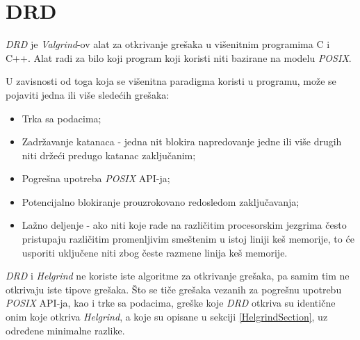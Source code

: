 \documentclass[12pt,oneside]{memoir}
\theoremstyle{plain}
\theoremstyle{definition}
\begin{document}
\section{DRD}
\textit{DRD} je \textit{Valgrind}-ov alat za otkrivanje grešaka u višenitnim programima C i C++. Alat radi za bilo koji program koji koristi niti bazirane na modelu \textit{POSIX}.

U zavisnosti od toga koja se višenitna paradigma koristi u programu, može se pojaviti jedna ili više sledećih grešaka:
\begin{itemize}
\item Trka sa podacima;
\item Zadržavanje katanaca - jedna nit blokira napredovanje jedne ili više drugih niti držeći predugo katanac zaključanim;
\item Pogrešna upotreba \textit{POSIX} API-ja;
\item Potencijalno blokiranje prouzrokovano redosledom zaključavanja;
\item Lažno deljenje - ako niti koje rade na različitim procesorskim jezgrima često pristupaju različitim promenljivim smeštenim u istoj liniji keš memorije, to će usporiti uključene niti zbog česte razmene linija keš memorije.
\end{itemize} 

\textit{DRD} i \textit{Helgrind} ne koriste iste algoritme za otkrivanje grešaka, pa samim tim ne otkrivaju iste tipove grešaka.
Što se tiče grešaka vezanih za pogrešnu upotrebu \textit{POSIX} API-ja, kao i trke sa podacima, greške koje \textit{DRD} otkriva su identične onim koje otkriva \textit{Helgrind}, a koje su opisane u sekciji \ref{HelgrindSection},  uz određene minimalne razlike.
\end{document}
